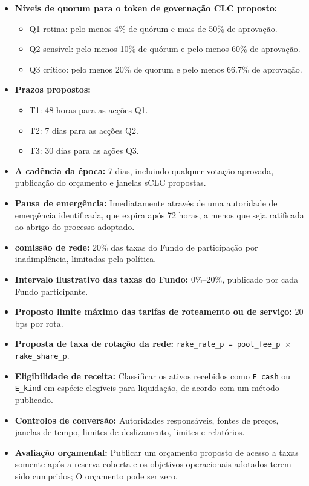 \documentclass[11pt]{article}
\begin{document}
\begin{itemize}[leftmargin=*]
\item \textbf{Níveis de quorum para o token de governação CLC proposto:}
\begin{itemize}[leftmargin=*]
\item Q1 rotina: pelo menos 4\% de quórum e mais de 50\% de aprovação.
\item Q2 sensível: pelo menos 10\% de quórum e pelo menos 60\% de aprovação.
\item Q3 crítico: pelo menos 20\% de quorum e pelo menos 66.7\% de aprovação.
\end{itemize}
\item \textbf{Prazos propostos:}
\begin{itemize}[leftmargin=*]
\item T1: 48 horas para as acções Q1.
\item T2: 7 dias para as acções Q2.
\item T3: 30 dias para as ações Q3.
\end{itemize}
\item \textbf{A cadência da época:} 7 dias, incluindo qualquer votação aprovada, publicação do orçamento e janelas sCLC propostas.
\item \textbf{Pausa de emergência:} Imediatamente através de uma autoridade de emergência identificada, que expira após 72 horas, a menos que seja ratificada ao abrigo do processo adoptado.
\item \textbf{comissão de rede:} 20\% das taxas do Fundo de participação por inadimplência, limitadas pela política.
\item \textbf{Intervalo ilustrativo das taxas do Fundo:} 0\%--20\%, publicado por cada Fundo participante.
\item \textbf{Proposto limite máximo das tarifas de roteamento ou de serviço:} 20 bps por rota.
\item \textbf{Proposta de taxa de rotação da rede:} \texttt{rake\_rate\_p = pool\_fee\_p $\times$ rake\_share\_p}.
\item \textbf{Eligibilidade de receita:} Classificar os ativos recebidos como \texttt{E\_cash} ou \texttt{E\_kind} em espécie elegíveis para liquidação, de acordo com um método publicado.
\item \textbf{Controlos de conversão:} Autoridades responsáveis, fontes de preços, janelas de tempo, limites de deslizamento, limites e relatórios.
\item \textbf{Avaliação orçamental:} Publicar um orçamento proposto de acesso a taxas somente após a reserva coberta e os objetivos operacionais adotados terem sido cumpridos; O orçamento pode ser zero.

\end{itemize}
\end{document}
